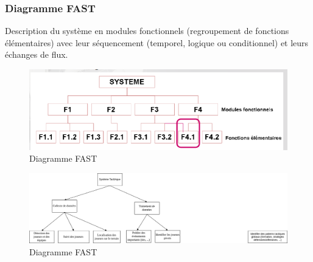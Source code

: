 \subsubsection{Diagramme FAST}
Description du système en modules fonctionnels (regroupement de fonctions élémentaires) avec leur séquencement (temporel, logique ou conditionnel) et leurs échanges de flux.
\begin{figure}[!h]
    \begin{center}
        \includegraphics[scale=0.7]{images/fast.png}
        \caption{Diagramme FAST}
    \end{center}
\end{figure}
\begin{figure}[!h]
    \begin{center}
        \includegraphics[scale=0.5]{images/tactIAque_fast.png}
        \caption{Diagramme FAST}
    \end{center}
\end{figure}
